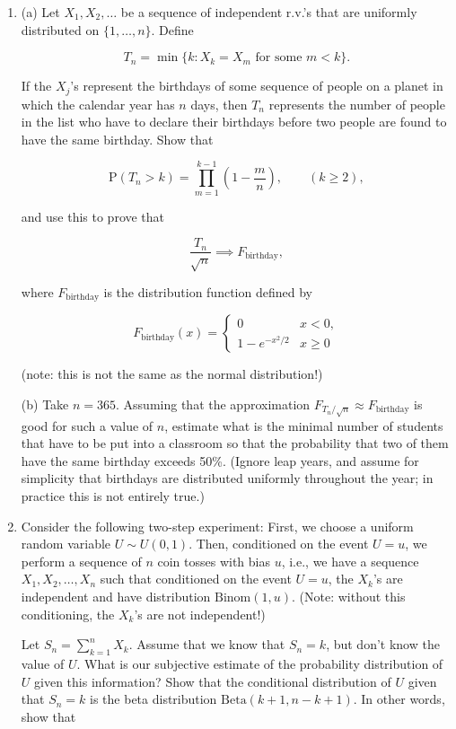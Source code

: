 \documentclass[11pt]{report}
\theoremstyle{plain}
\theoremstyle{definition}
\begin{document}
\begin{enumerate}[label=\arabic*.]
to compute $\int_x^\infty (1+u^{-2})e^{-u^2/2}\,du$.
On the other hand, show that this integral is bounded
from above by
$(1+x^{-2})\int_x^{\infty} e^{-u^2/2}\,du$.

\item (a) Let $X_1, X_2, \ldots$ be a sequence of
independent r.v.'s that are uniformly distributed on
$\{1,\ldots,n\}$. Define

\[
T_n = \min\{ k : X_k = X_m\textrm{ for some }m<k\}.
\]

If the $X_j$'s represent the birthdays of some
sequence of people on a planet in which the calendar
year has $n$ days, then $T_n$ represents the number
of people in the list who have to declare their
birthdays before two people are found to have the same
birthday. Show that

\[
\mathrm{P}(T_n > k) = \prod_{m=1}^{k-1} \left(1-\frac{m}{n}\right), \qquad (k\ge 2),
\]

and use this to prove that

\[
\frac{T_n}{\sqrt{n}} \implies F_{\textrm{birthday}},
\]

where $F_{\textrm{birthday}}$ is the distribution
function defined by

\[
F_{\textrm{birthday}}(x) = \begin{cases} 0 & x<0, \\ 1- e^{-x^2/2} & x\ge 0 \end{cases}
\]

(note: this is not the same as the normal
distribution!)

(b) Take $n=365$. Assuming that the approximation
$F_{T_n/\sqrt{n}} \approx F_{\textrm{birthday}}$ is
good for such a value of $n$, estimate what is the
minimal number of students that have to be put into a
classroom so that the probability that two of them
have the same birthday exceeds 50\%. (Ignore leap
years, and assume for simplicity that birthdays are
distributed uniformly throughout the year; in practice
this is not entirely true.)

\item Consider the following two-step experiment: First, we
choose a uniform random variable $U \sim U(0,1)$.
Then, conditioned on the event $U=u$, we perform a
sequence of $n$ coin tosses with bias $u$, i.e., we
have a sequence $X_1,X_2,\ldots,X_n$ such that
conditioned on the event $U=u$, the $X_k$'s are
independent and have distribution
$\textrm{Binom}(1,u)$. (Note: without this
conditioning, the $X_k$'s are not independent!)

Let $S_n = \sum_{k=1}^n X_k$. Assume that we know
that $S_n=k$, but don't know the value of $U$. What
is our subjective estimate of the probability
distribution of $U$ given this information? Show that
the conditional distribution of $U$ given that
$S_n = k$ is the beta distribution
$\textrm{Beta}(k+1,n-k+1)$. In other words, show that


\end{enumerate}
\end{document}
